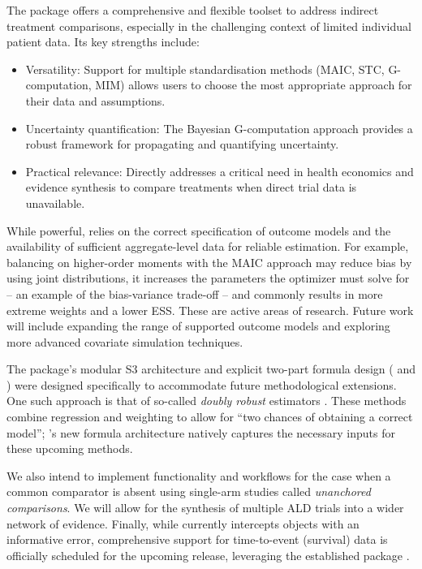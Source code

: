 \documentclass[article]{jss}
\begin{document}
The  package offers a comprehensive and flexible toolset to address indirect treatment comparisons, especially in the challenging context of limited individual patient data. Its key strengths include:
\begin{itemize}
    \item Versatility: Support for multiple standardisation methods (MAIC, STC, G-computation, MIM) allows users to choose the most appropriate approach for their data and assumptions.
    \item Uncertainty quantification: The Bayesian G-computation approach provides a robust framework for propagating and quantifying uncertainty.
    \item Practical relevance: Directly addresses a critical need in health economics and evidence synthesis to compare treatments when direct trial data is unavailable.
\end{itemize}
While powerful,  relies on the correct specification of outcome models and the availability of sufficient aggregate-level data for reliable estimation. For example, balancing on higher-order moments with the MAIC approach may reduce bias by using joint distributions, it increases the parameters the optimizer must solve for -- an example of the bias-variance trade-off -- and commonly results in more extreme weights and a lower ESS.
These are active areas of research. Future work will include expanding the range of supported outcome models and exploring more advanced covariate simulation techniques.

The package’s modular S3 architecture and explicit two-part formula design ( and ) were designed specifically to accommodate future methodological extensions. One such approach is that of so-called \emph{doubly robust} estimators \citep{campbell2025}. These methods combine regression and weighting to allow for ``two chances of obtaining a correct model''; 's new formula architecture natively captures the necessary inputs for these upcoming methods.

We also intend to implement functionality and workflows for the case when a common comparator is absent using single-arm studies called \emph{unanchored comparisons}. We will allow for the synthesis of multiple ALD trials into a wider network of evidence. Finally, while  currently intercepts  objects with an informative error, comprehensive support for time-to-event (survival) data is officially scheduled for the upcoming release, leveraging the established  package \citep{survivalpkg}.
\end{document}

